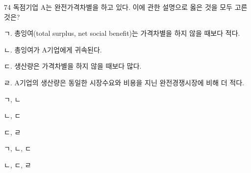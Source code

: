 \begin{question}{74}
독점기업 A는 완전가격차별을 하고 있다. 이에 관한 설명으로 옳은 것을 모두 고른 것은?
\begin{framedtext}
ㄱ. 총잉여(total surplus, net social benefit)는 가격차별을 하지 않을 때보다 적다. \par
ㄴ. 총잉여가 A기업에게 귀속된다. \par
ㄷ. 생산량은 가격차별을 하지 않을 때보다 많다. \par
ㄹ. A기업의 생산량은 동일한 시장수요와 비용을 지닌 완전경쟁시장에 비해 더 적다. \par
\end{framedtext}
\begin{choices}
  \item ㄱ, ㄴ
  \item ㄴ, ㄷ
  \item ㄷ, ㄹ
  \item ㄱ, ㄴ, ㄷ
  \item ㄴ, ㄷ, ㄹ
\end{choices}
\end{question}
